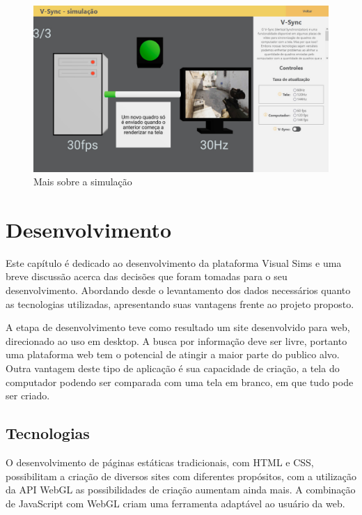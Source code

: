 \documentclass[tcc,capa]{texufpel}
\begin{document}
\begin{figure}[htbp]
  \centering \includegraphics[scale=.2]{Navegacao/pagina_simulacao_extra.jpeg}
  \caption{Mais sobre a simulação}
  \label{simulacao_extra}
\end{figure}

\chapter{Desenvolvimento}
\label{cap: desenvolvimento}

Este capítulo é dedicado ao desenvolvimento da plataforma Visual Sims e uma breve discussão acerca das decisões que foram tomadas para o seu desenvolvimento. Abordando desde o levantamento dos dados necessários quanto as tecnologias utilizadas, apresentando suas vantagens frente ao projeto proposto.

A etapa de desenvolvimento teve como resultado um site desenvolvido para web, direcionado ao uso em desktop. A busca por informação deve ser livre, portanto uma plataforma web tem o potencial de atingir a maior parte do publico alvo. Outra vantagem deste tipo de aplicação é sua capacidade de criação, a tela do computador podendo ser comparada com uma tela em branco, em que tudo pode ser criado.

\section{Tecnologias}

O desenvolvimento de páginas estáticas tradicionais, com HTML e CSS, possibilitam a criação de diversos sites com diferentes propósitos, com a utilização da API WebGL as possibilidades de criação aumentam ainda mais. A combinação de JavaScript com WebGL criam uma ferramenta adaptável ao usuário da web.
\end{document}
